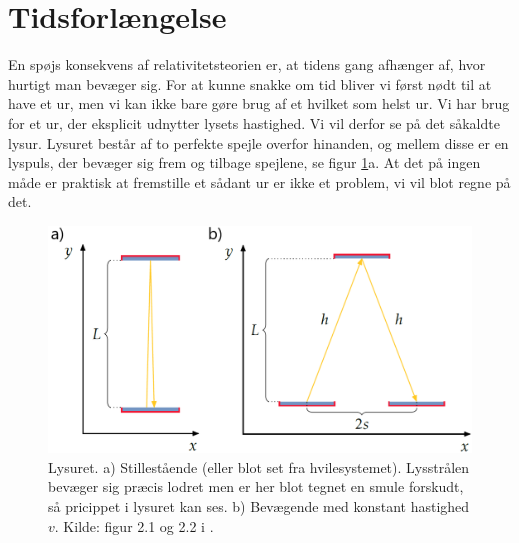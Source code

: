 \section{Tidsforlængelse} \label{sec:Tidsforlaengelse}
En spøjs konsekvens af relativitetsteorien er, at tidens gang afhænger af, hvor hurtigt man bevæger sig. For at kunne snakke om tid bliver vi først nødt til at have et ur, men vi kan ikke bare gøre brug af et hvilket som helst ur. Vi har brug for et ur, der eksplicit udnytter lysets hastighed. Vi vil derfor se på det såkaldte lysur. Lysuret består af to perfekte spejle overfor hinanden, og mellem disse er en lyspuls, der bevæger sig frem og tilbage spejlene, se figur \ref{fig:Lysur}a. At det på ingen måde er praktisk at fremstille et sådant ur er ikke et problem, vi vil blot regne på det.

\begin{figure}
    \centering
    \includegraphics[width=.8\textwidth]{SR/billeder/Lysur.png}
    \caption{Lysuret. a) Stillestående (eller blot set fra hvilesystemet). Lysstrålen bevæger sig præcis lodret men er her blot tegnet en smule forskudt, så pricippet i lysuret kan ses. b) Bevægende med konstant hastighed $v$. Kilde: figur 2.1 og 2.2 i \cite{uggerhojSpecielRelativitetsteori2016}.}
    \label{fig:Lysur}
\end{figure}

